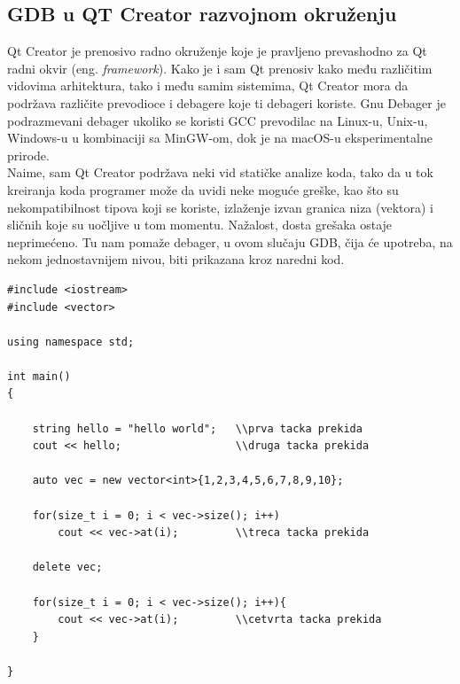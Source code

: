 \documentclass[a4paper]{article}
\begin{document}
\subsection{GDB u QT Creator razvojnom okruženju}
\label{subsec:QT}

Qt Creator je prenosivo radno okruženje koje je pravljeno prevashodno za Qt radni okvir (eng. \textit{framework}).
Kako je i sam Qt prenosiv kako među različitim vidovima arhitektura, tako i među samim sistemima, Qt Creator
mora da podržava različite prevodioce i debagere koje ti debageri koriste. Gnu Debager je podrazmevani debager
ukoliko se koristi GCC prevodilac na Linux-u, Unix-u, Windows-u u kombinaciji sa MinGW-om, dok je na macOS-u
eksperimentalne prirode. \cite{QT}
\\
Naime, sam Qt Creator podržava neki vid statičke analize koda, tako da u tok kreiranja koda programer može da 
uvidi neke moguće greške, kao što su nekompatibilnost tipova koji se koriste, izlaženje izvan granica niza (vektora) 
i sličnih koje su uočljive u tom momentu. Nažalost, dosta grešaka ostaje neprimećeno. Tu nam pomaže debager,
u ovom slučaju GDB, čija će upotreba, na nekom jednostavnijem nivou, biti prikazana kroz naredni kod. 

\begin{lstlisting}[caption={Primer jednostavnog programa za prikaz rada GDB-a u Qt Creator-u},frame=single, label=simple]
#include <iostream>
#include <vector>

using namespace std;

int main()
{

    string hello = "hello world";   \\prva tacka prekida
    cout << hello;                  \\druga tacka prekida

    auto vec = new vector<int>{1,2,3,4,5,6,7,8,9,10};

    for(size_t i = 0; i < vec->size(); i++)
        cout << vec->at(i);         \\treca tacka prekida

    delete vec;

    for(size_t i = 0; i < vec->size(); i++){
        cout << vec->at(i);         \\cetvrta tacka prekida
    }

}
\end{lstlisting}
\end{document}
